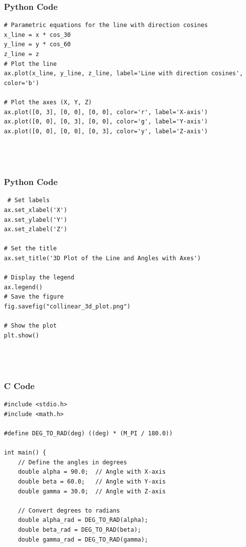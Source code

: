 \documentclass{beamer}
\begin{document}
\begin{frame}[fragile]
    \frametitle{Python Code}

    \begin{lstlisting}
# Parametric equations for the line with direction cosines
x_line = x * cos_30
y_line = y * cos_60
z_line = z
# Plot the line
ax.plot(x_line, y_line, z_line, label='Line with direction cosines', color='b')

# Plot the axes (X, Y, Z)
ax.plot([0, 3], [0, 0], [0, 0], color='r', label='X-axis')
ax.plot([0, 0], [0, 3], [0, 0], color='g', label='Y-axis')
ax.plot([0, 0], [0, 0], [0, 3], color='y', label='Z-axis')




    \end{lstlisting}
\end{frame}

\begin{frame}[fragile]
    \frametitle{Python Code}

    \begin{lstlisting}
 # Set labels
ax.set_xlabel('X')
ax.set_ylabel('Y')
ax.set_zlabel('Z')

# Set the title
ax.set_title('3D Plot of the Line and Angles with Axes')

# Display the legend
ax.legend()
# Save the figure
fig.savefig("collinear_3d_plot.png")

# Show the plot
plt.show()




    \end{lstlisting}
\end{frame}

\begin{frame}[fragile]
\frametitle{C Code}
\begin{lstlisting}
#include <stdio.h>
#include <math.h>

#define DEG_TO_RAD(deg) ((deg) * (M_PI / 180.0))

int main() {
    // Define the angles in degrees
    double alpha = 90.0;  // Angle with X-axis
    double beta = 60.0;   // Angle with Y-axis
    double gamma = 30.0;  // Angle with Z-axis
    
    // Convert degrees to radians
    double alpha_rad = DEG_TO_RAD(alpha);
    double beta_rad = DEG_TO_RAD(beta);
    double gamma_rad = DEG_TO_RAD(gamma);

    \end{lstlisting}

\end{frame}
\end{document}
